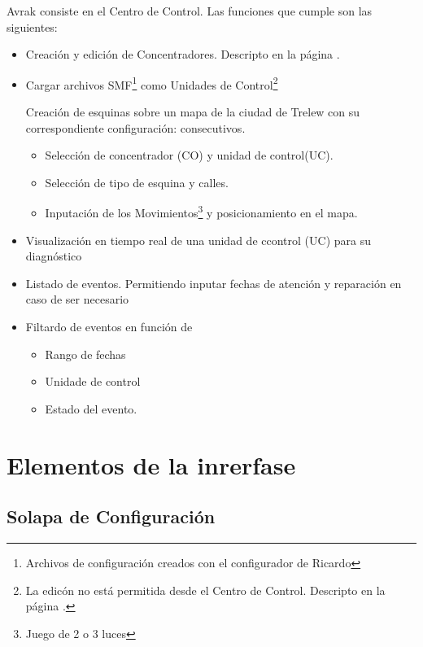 \documentclass[11pt,a4paper]{report}
\begin{document}
Avrak consiste en el Centro de Control. Las funciones que cumple son las
siguientes:
\begin{itemize}
  \item {Creación y edición de Concentradores. Descripto en la
  página \pageref{ch:couc}.}
  \item Cargar archivos SMF\footnote{Archivos de configuración creados con el
  configurador de Ricardo} como Unidades de Control\footnote{La edicón no está
  permitida desde el Centro de Control. Descripto en la página
  \pageref{ch:couc}.}
  
   \begin{item}
   Creación de esquinas sobre un mapa de la ciudad de Trelew con su
   correspondiente configuración:
   consecutivos.
   \begin{itemize}
     \item Selección de concentrador (CO) y unidad de control(UC).
     \item Selección de tipo de esquina y calles.
     \item Inputación de los Movimientos\footnote{Juego de 2 o 3 luces} y
     posicionamiento en el mapa.
   \end{itemize}
   \end{item}
   \item{Visualización en tiempo real de una unidad de ccontrol (UC) para su
  	diagnóstico}
   \item{Listado de eventos. Permitiendo inputar fechas de atención y
   reparación en caso de ser necesario}
   \item 
   \begin{item}
    Filtardo de eventos en función de
    \begin{itemize}
      \item Rango de fechas
      \item Unidade de control
      \item Estado del evento.
    \end{itemize}
   \end{item}
  
\end{itemize}

\chapter{Elementos de la inrerfase}
\label{ch:couc}

\section{Solapa de Configuración}
\end{document}
